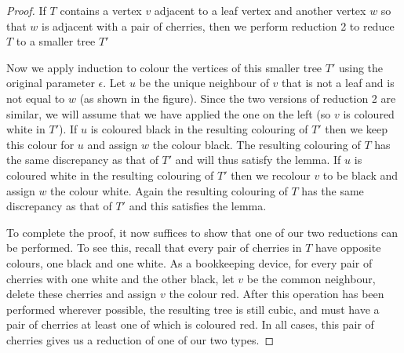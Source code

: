 \documentclass[10pt,a4paper]{amsart}
\begin{document}
\begin{proof}
\bigskip


If $T$ contains a vertex $v$ adjacent to a leaf vertex and another vertex $w$ so that $w$ is adjacent with a pair of cherries, then we perform reduction 2 to reduce $T$ to a smaller tree $T'$

\begin{center}

\end{center}

Now we apply induction to colour the vertices of this smaller tree $T'$ using the original parameter $\epsilon$.  Let $u$ be the unique neighbour of $v$ that is not a leaf and is not equal to $w$ (as shown in the figure).  Since the two versions of reduction 2 are similar, we will assume that we have applied the one on the left (so $v$ is coloured white in $T'$).  If $u$ is coloured black in the resulting colouring of $T'$ then we keep this colour for $u$ and assign $w$ the colour black.  The resulting colouring of $T$ has the same discrepancy as that of $T'$ and will thus satisfy the lemma.  If $u$ is coloured white in the resulting colouring of $T'$ then we recolour $v$ to be black and assign $w$ the colour white.  Again the resulting colouring of $T$ has the same discrepancy as that of $T'$ and this satisfies the lemma.  

\bigskip

To complete the proof, it now suffices to show that one of our two reductions can be performed.  To see this, recall that every pair of cherries in $T$ have opposite colours, one black and one white.  As a bookkeeping device, for every pair of cherries with one white and the other black, let $v$ be the common neighbour, delete these cherries and assign $v$ the colour red.   After this operation has been performed wherever possible, the resulting tree is still cubic, and must have a pair of cherries at least one of which is coloured red.  In all cases, this pair of cherries gives us a reduction of one of our two types.
\end{proof}
\end{document}
